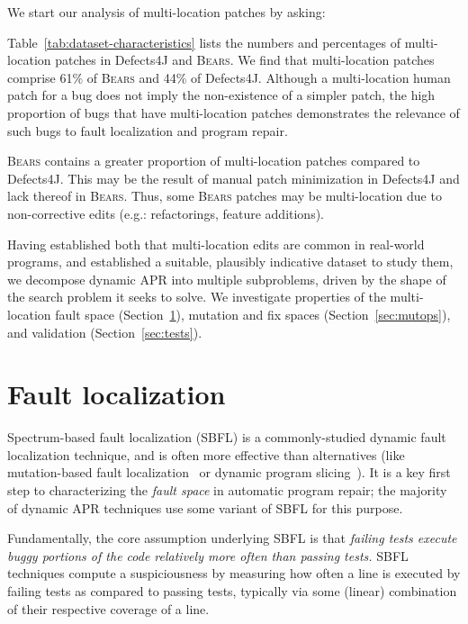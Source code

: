 \documentclass[10pt, conference]{IEEEtran}
\newcommand\bears{\textsc{Bears}\xspace}
\begin{document}
We start our analysis of multi-location patches by asking:

Table~\ref{tab:dataset-characteristics} lists the numbers and percentages of
multi-location patches in Defects4J and \bears. 
We find that multi-location patches comprise 61\% of \bears and 44\% of Defects4J.
Although a multi-location human patch for a bug does not imply the 
non-existence of a simpler patch, the high proportion of bugs that have 
multi-location patches demonstrates the relevance of such bugs to fault localization and
program repair. 

\bears contains a greater proportion of 
multi-location patches compared to Defects4J. This may be the 
result of manual patch minimization in Defects4J
and lack thereof in \bears.
Thus, some \bears patches may be multi-location due to
non-corrective edits (e.g.: refactorings, feature additions).

Having established both that multi-location edits are common in real-world
programs, and established a suitable, plausibly indicative dataset to study
them, we decompose dynamic APR into multiple subproblems, driven by the
shape of the search problem it seeks to solve. We 
investigate properties of the multi-location fault space (Section~\ref{secFL}),
mutation and fix spaces (Section~\ref{sec:mutops}), and validation
(Section~\ref{sec:tests}). 

\section{Fault localization} \label{secFL}


Spectrum-based fault localization (SBFL) is a commonly-studied dynamic
fault localization technique, and is often more effective than alternatives (like mutation-based fault 
localization~\cite{mut-analysis} or dynamic program
slicing~\cite{zou2019empirical}). It is a key first step to characterizing the
\emph{fault space} in automatic program repair; the majority of dynamic APR
techniques use some variant of SBFL for this purpose.

Fundamentally, the core assumption underlying SBFL is that \emph{failing tests
  execute buggy portions of the code relatively more often than passing tests.}
SBFL techniques compute a suspiciousness by
measuring how often a line is executed by failing tests as compared to passing
tests, typically via some (linear) combination of their respective
coverage of a line.
\end{document}
